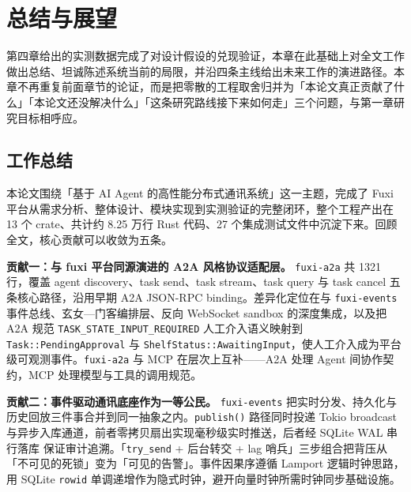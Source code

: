 
\section{总结与展望}

第四章给出的实测数据完成了对设计假设的兑现验证，本章在此基础上对全文工作做出总结、坦诚陈述系统当前的局限，并沿四条主线给出未来工作的演进路径。本章不再重复前面章节的论证，而是把零散的工程取舍归并为「本论文真正贡献了什么」「本论文还没解决什么」「这条研究路线接下来如何走」三个问题，与第一章研究目标相呼应。

\subsection{工作总结}
\label{subsec:summary}

本论文围绕「基于 AI Agent 的高性能分布式通讯系统」这一主题，完成了 Fuxi 平台从需求分析、整体设计、模块实现到实测验证的完整闭环，整个工程产出在 13 个 crate、共计约 8.25 万行 Rust 代码、27 个集成测试文件中沉淀下来。回顾全文，核心贡献可以收敛为五条。

\textbf{贡献一：与 fuxi 平台同源演进的 A2A 风格协议适配层。} \texttt{fuxi-a2a} 共 1321 行，覆盖 agent discovery、task send、task stream、task query 与 task cancel 五条核心路径，沿用早期 A2A JSON-RPC binding。差异化定位在与 \texttt{fuxi-events} 事件总线、玄女—门客编排层、反向 WebSocket sandbox 的深度集成，以及把 A2A 规范 \texttt{TASK\_STATE\_INPUT\_REQUIRED} 人工介入语义映射到 \texttt{Task::PendingApproval} 与 \texttt{ShelfStatus::AwaitingInput}，使人工介入成为平台级可观测事件。\texttt{fuxi-a2a} 与 MCP\parencite{anthropic2024mcp} 在层次上互补——A2A 处理 Agent 间协作契约，MCP 处理模型与工具的调用规范。

\textbf{贡献二：事件驱动通讯底座作为一等公民。} \texttt{fuxi-events} 把实时分发、持久化与历史回放三件事合并到同一抽象之内。\texttt{publish()} 路径同时投递 Tokio broadcast 与异步入库通道，前者零拷贝扇出实现毫秒级实时推送\parencite{tokio2024broadcast}，后者经 SQLite WAL 串行落库\parencite{sqlite2024wal} 保证审计追溯。「\texttt{try\_send} + 后台转交 + lag 哨兵」三步组合把背压从「不可见的死锁」变为「可见的告警」。事件因果序遵循 Lamport 逻辑时钟思路\parencite{lamport1978time}，用 SQLite \texttt{rowid} 单调递增作为隐式时钟，避开向量时钟所需时钟同步基础设施。


